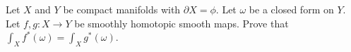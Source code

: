 Let $X$ and $Y$ be compact manifolds with $\partial X = \phi$. Let
$\omega$ be a closed form on $Y$. Let $f,g:X\rightarrow Y$ be smoothly
homotopic smooth maps. Prove that $\int_{X}f^{*}(\omega)=\int_X
g^*(\omega)$.
